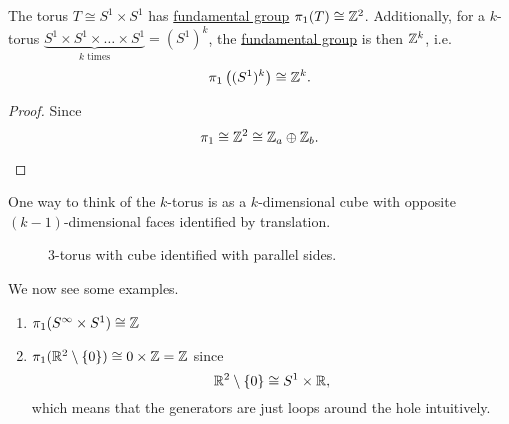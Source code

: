 \begin{corollary}
	The torus \(T\cong S^{1}\times S^1\) has \hyperref[def:fundamental-group]{fundamental group} \(\pi _1(T)\cong \mathbb{\MakeUppercase{z}} ^2\). Additionally,
	for a \(k\)-torus \(\underbrace{S^{1}\times S^1 \times \ldots \times S^1}_{k\text{ times}} = (S^1)^k\), the \hyperref[def:fundamental-group]{fundamental group}
	is then \(\mathbb{\MakeUppercase{z}} ^k\), i.e.
	\[
		\pi _1\left((S^1)^k\right) \cong \mathbb{\MakeUppercase{z}} ^k.
	\]
\end{corollary}
\begin{proof}
	Since
	\[
		\pi _1 \cong \mathbb{\MakeUppercase{z}}^2 \cong \mathbb{\MakeUppercase{z}} _a \oplus \mathbb{\MakeUppercase{z}} _b.
	\]
	\begin{figure}[H]
		\centering
		\label{fig:pf:torus-fundamental-group}
	\end{figure}
\end{proof}
\begin{remark}
	One way to think of the \(k\)-torus is as a \(k\)-dimensional cube with opposite \((k-1)\)-dimensional faces identified by translation.
	\begin{figure}[H]
		\centering
		\caption{\(3\)-torus with cube identified with parallel sides.}
		\label{fig:3-torus}
	\end{figure}
\end{remark}

\begin{eg}
	We now see some examples.
	\begin{enumerate}
		\item \(\pi _1(S^{\infty }\times S^1) \cong \mathbb{\MakeUppercase{z}} \)
		\item \(\pi _1(\mathbb{\MakeUppercase{r}} ^2\setminus \{0\}) \cong 0\times \mathbb{\MakeUppercase{z}} = \mathbb{\MakeUppercase{z}}\) since
		      \[
			      \mathbb{\MakeUppercase{r}} ^2\setminus \{0\}\cong S^{1}\times \mathbb{\MakeUppercase{r}},
		      \]
		      which means that the generators are just loops around the hole intuitively.
	\end{enumerate}
\end{eg}

